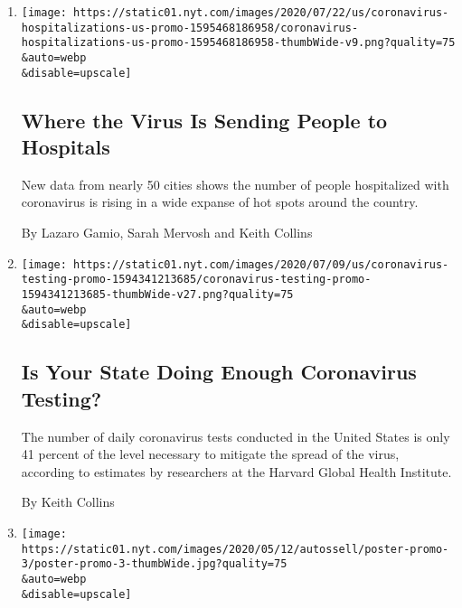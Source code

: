 \begin{enumerate}
\def\labelenumi{\arabic{enumi}.}
\item
  \href{/interactive/2020/07/23/us/coronavirus-hospitalizations-us.html}{}

  \texttt{[image: https://static01.nyt.com/images/2020/07/22/us/coronavirus-hospitalizations-us-promo-1595468186958/coronavirus-hospitalizations-us-promo-1595468186958-thumbWide-v9.png?quality=75\\\&auto=webp\\\&disable=upscale]}

  \hypertarget{where-the-virus-is-sending-people-to-hospitals}{%
  \subsection{Where the Virus Is Sending People to
  Hospitals}\label{where-the-virus-is-sending-people-to-hospitals}}

  New data from nearly 50 cities shows the number of people hospitalized
  with coronavirus is rising in a wide expanse of hot spots around the
  country.

  By Lazaro Gamio, Sarah Mervosh and Keith Collins
\item
  \href{/interactive/2020/us/coronavirus-testing.html}{}

  \texttt{[image: https://static01.nyt.com/images/2020/07/09/us/coronavirus-testing-promo-1594341213685/coronavirus-testing-promo-1594341213685-thumbWide-v27.png?quality=75\\\&auto=webp\\\&disable=upscale]}

  \hypertarget{is-your-state-doing-enough-coronavirus-testing}{%
  \subsection{Is Your State Doing Enough Coronavirus
  Testing?}\label{is-your-state-doing-enough-coronavirus-testing}}

  The number of daily coronavirus tests conducted in the United States
  is only 41 percent of the level necessary to mitigate the spread of
  the virus, according to estimates by researchers at the Harvard Global
  Health Institute.

  By Keith Collins
\item
  \href{/interactive/2020/05/12/us/coronavirus-testing-white-house.html}{}

  \texttt{[image: https://static01.nyt.com/images/2020/05/12/autossell/poster-promo-3/poster-promo-3-thumbWide.jpg?quality=75\\\&auto=webp\\\&disable=upscale]}

  \hypertarget{the-white-house-uses-this-device-for-virus-testing-some-results-might-be-false}{%
}
\end{enumerate}
